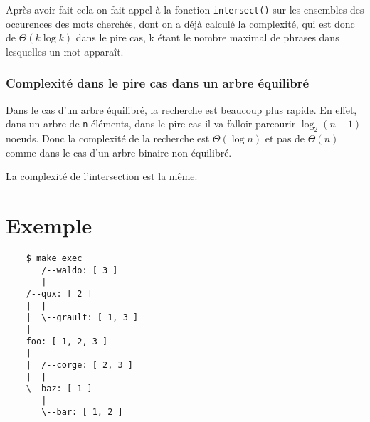 \documentclass[11pt]{article}
\begin{document}
        Après avoir fait cela on fait appel à la fonction \texttt{intersect()}
        sur les ensembles des occurences des mots cherchés, dont on a déjà
        calculé la complexité, qui est donc de $\Theta(k\log{}k)$ dans le pire cas,
        k étant le nombre maximal de phrases dans lesquelles un mot apparaît.

        \subsubsection{Complexité dans le pire cas dans un arbre équilibré}
        Dans le cas d'un arbre équilibré, la recherche est beaucoup plus rapide.
        En effet, dans un arbre de \texttt{n} éléments, dans le pire cas il va falloir
        parcourir ${\log_2(n+1)}$ noeuds. Donc la complexité de la recherche
        est $\Theta(\log{}n)$ et pas de $\Theta(n)$ comme dans le cas d'un arbre
        binaire non équilibré.

        La complexité de l'intersection est la même.


    \section{Exemple}

    \begin{verbatim}
    $ make exec
       /--waldo: [ 3 ]
       |
    /--qux: [ 2 ]
    |  |
    |  \--grault: [ 1, 3 ]
    |
    foo: [ 1, 2, 3 ]
    |
    |  /--corge: [ 2, 3 ]
    |  |
    \--baz: [ 1 ]
       |
       \--bar: [ 1, 2 ]
    \end{verbatim}
\end{document}
